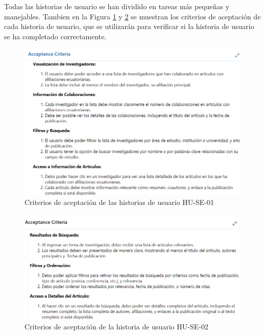 Todas las historias de usuario se han dividido en tareas más pequeñas y manejables. 
Tambien en la Figura \ref{fig:aceptance-criteria-HU-SE-01}  y  \ref{fig:aceptance-criteria-HU-SE-02} se muestran los criterios de aceptación de cada historia de usuario, que se utilizarán para verificar si la historia de usuario se ha completado correctamente.
\begin{figure}[H]
    \centering
    \includegraphics[scale=0.7]{../02Figures/02Chapter/Sprints/Sprint-1/aceptance-criteria-HU-SE-01.png}
    \caption{Criterios de aceptación de las historias de usuario HU-SE-01}
    \label{fig:aceptance-criteria-HU-SE-01}
\end{figure}
\begin{figure}[H]
    \centering
    \includegraphics[scale=0.7]{../02Figures/02Chapter/Sprints/Sprint-1/aceptance-criteria-HU-SE-02.png}
    \caption{Criterios de aceptación de la historia de usuario HU-SE-02}
    \label{fig:aceptance-criteria-HU-SE-02}
\end{figure}


